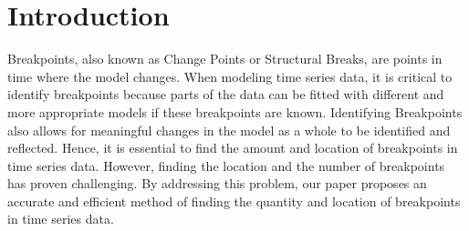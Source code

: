 \documentclass[submit]{smj}
\begin{document}
\maketitle


\section{Introduction}
    Breakpoints, also known as Change Points or Structural Breaks, are points in time where the model changes. When modeling time series data, it is critical to identify breakpoints because parts of the data can be fitted with different and more appropriate models if these breakpoints are known. Identifying Breakpoints also allows for meaningful changes in the model as a whole to be identified and reflected. Hence, it is essential to find the amount and location of breakpoints in time series data. However, finding the location and the number of breakpoints has proven challenging. By addressing this problem, our paper proposes an accurate and efficient method of finding the quantity and location of breakpoints in time series data.
    
\end{document}

